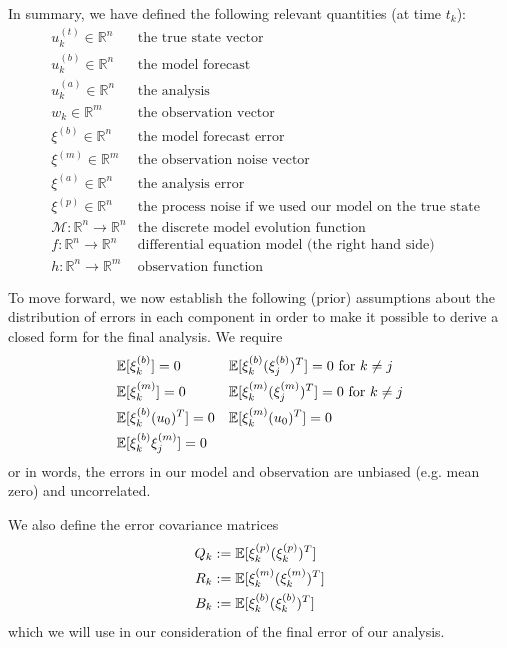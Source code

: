 In summary, we have defined the following relevant quantities (at time $t_k$):
\begin{align}
  &u_k^{(t)} \in \mathbb{R}^n &\text{the true state vector} \\
  &u_k^{(b)} \in \mathbb{R}^n &\text{the model forecast} \\
  &u_k^{(a)} \in \mathbb{R}^n &\text{the analysis} \\
  &w_k \in \mathbb{R}^m &\text{the observation vector} \\
  &\xi^{(b)} \in \mathbb{R}^n &\text{the model forecast error}\\
  &\xi^{(m)} \in \mathbb{R}^m &\text{the observation noise vector}\\
  &\xi^{(a)} \in \mathbb{R}^n &\text{the analysis error}\\
  &\xi^{(p)} \in \mathbb{R}^n &\text{the process noise if we used our model on the true state}\\
  &\mathcal{M}:\mathbb{R}^n\to\mathbb{R}^n &\text{the discrete model evolution function}\\
  &f:\mathbb{R}^n\to\mathbb{R}^n &\text{differential equation model (the right hand side)}\\
  &h:\mathbb{R}^n\to\mathbb{R}^m  &\text{observation function}
\end{align}

To move forward, we now establish the following (prior) assumptions about the distribution of errors in each component in order to make it possible to derive a closed form for the final analysis. We require
\begin{align}
  &\E[\xi_k^{(b)}] = 0 & &\E[\xi_k^{(b)}(\xi_j^{(b)})^T] = 0 \text{ for } k\neq j\\
  &\E[\xi_k^{(m)}] = 0 & &\E[\xi_k^{(m)}(\xi_j^{(m)})^T] = 0 \text{ for } k\neq j\\
  &\E[\xi_k^{(b)}(u_0)^T] = 0 & &\E[\xi_k^{(m)}(u_0)^T] = 0\\
  &\E[\xi_k^{(b)}\xi_j^{(m)}] = 0 & &  %
\end{align}
or in words, the errors in our model and observation are unbiased (e.g. mean zero) and uncorrelated.

We also define the error covariance matrices
\begin{align}
  Q_k &:= \mathbb{E}[\xi_k^{(p)}(\xi_k^{(p)})^T] \\
  R_k &:= \mathbb{E}[\xi_k^{(m)}(\xi_k^{(m)})^T] \\
  B_k &:= \mathbb{E}[\xi_k^{(b)}(\xi_k^{(b)})^T]
\end{align}
which we will use in our consideration of the final error of our analysis.

